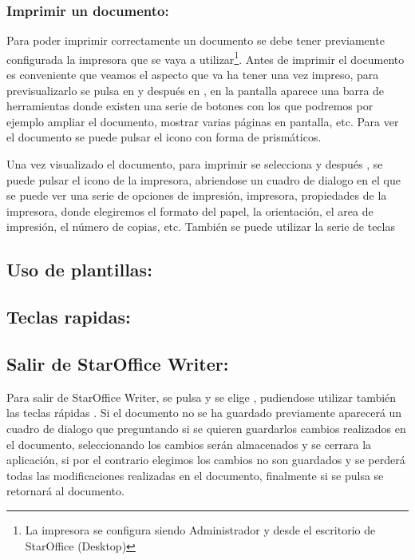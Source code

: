 \subsubsection{Imprimir un documento:}

Para poder imprimir correctamente un documento se debe tener previamente configurada
la impresora que se vaya a utilizar\footnote{%
La impresora se configura siendo Administrador y desde el escritorio de StarOffice
(Desktop)
}. Antes de imprimir el documento es conveniente que veamos el aspecto que va
ha tener una vez impreso, para previsualizarlo se pulsa en  y después
en , en la pantalla aparece una barra de herramientas
donde existen una serie de botones con los que podremos por ejemplo ampliar
el documento, mostrar varias páginas en pantalla, etc. Para ver el documento
se puede pulsar el icono con forma de prismáticos.


Una vez visualizado el documento, para imprimir se selecciona 
y después , se puede pulsar el icono de la impresora, abriendose
un cuadro de dialogo en el que se puede ver una serie de opciones de impresión,
impresora, propiedades de la impresora, donde elegiremos el formato del papel,
la orientación, el area de impresión, el número de copias, etc. También se
puede utilizar la serie de teclas 



\subsection{\label{Uso de Plantillas}Uso de plantillas:}



\subsection{Teclas rapidas:}


\subsection{Salir de StarOffice Writer:}

Para salir de StarOffice Writer, se pulsa  y se elige , pudiendose
utilizar también las teclas rápidas . Si el documento no se ha guardado
previamente aparecerá un cuadro de dialogo
 que preguntando si se quieren guardarlos cambios realizados en el documento, seleccionando  los cambios serán
almacenados y se cerrara la aplicación, si por el contrario elegimos 
los cambios no son guardados y se perderá todas las modificaciones realizadas
en el documento, finalmente si se pulsa  se retornará al documento.

